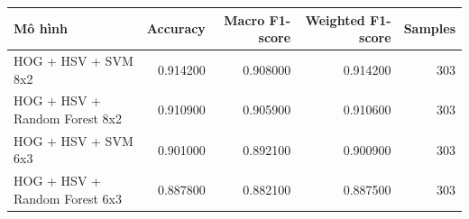 \begin{tabular}{lrrrr}
\toprule
Mô hình & Accuracy & Macro F1-score & Weighted F1-score & Samples \\
\midrule
HOG + HSV + SVM 8x2 & 0.914200 & 0.908000 & 0.914200 & 303 \\
HOG + HSV + Random Forest 8x2 & 0.910900 & 0.905900 & 0.910600 & 303 \\
HOG + HSV + SVM 6x3 & 0.901000 & 0.892100 & 0.900900 & 303 \\
HOG + HSV + Random Forest 6x3 & 0.887800 & 0.882100 & 0.887500 & 303 \\
\bottomrule
\end{tabular}
